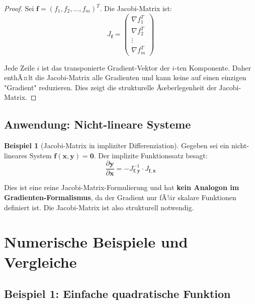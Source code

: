 ﻿\documentclass[a4paper,12pt]{article}
\theoremstyle{definition}
\newtheorem{beispiel}{Beispiel}
\begin{document}
\begin{proof}
	Sei $\boldsymbol{f} = (f_1, f_2, \ldots, f_m)^T$. Die Jacobi-Matrix ist:
	\[
	J_{\boldsymbol{f}} = \begin{pmatrix}
		\nabla f_1^T \\
		\nabla f_2^T \\
		\vdots \\
		\nabla f_m^T
	\end{pmatrix}
	\]
	
	Jede Zeile $i$ ist das transponierte Gradient-Vektor der $i$-ten Komponente. Daher enthÃ¤lt die Jacobi-Matrix alle Gradienten und kann keine auf einen einzigen "Gradient" reduzieren. Dies zeigt die strukturelle Ãœberlegenheit der Jacobi-Matrix.
\end{proof}

\subsection{Anwendung: Nicht-lineare Systeme}

\begin{beispiel}[Jacobi-Matrix in impliziter Differenziation]
	Gegeben sei ein nicht-lineares System $\boldsymbol{f}(\boldsymbol{x}, \boldsymbol{y}) = \boldsymbol{0}$. Der implizite Funktionssatz besagt:
	\[
	\frac{\partial \boldsymbol{y}}{\partial \boldsymbol{x}} = -J_{\boldsymbol{f},\boldsymbol{y}}^{-1} \cdot J_{\boldsymbol{f},\boldsymbol{x}}
	\]
	
	Dies ist eine reine Jacobi-Matrix-Formulierung und hat \textbf{kein Analogon im Gradienten-Formalismus}, da der Gradient nur fÃ¼r skalare Funktionen definiert ist. Die Jacobi-Matrix ist also strukturell notwendig.
\end{beispiel}

\section{Numerische Beispiele und Vergleiche}

\subsection{Beispiel 1: Einfache quadratische Funktion}
\end{document}
